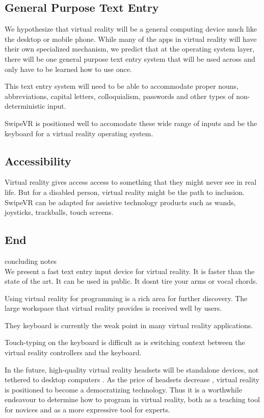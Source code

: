 \subsection{General Purpose Text Entry}
We hypothesize that virtual reality will be a general computing device much like the desktop or mobile phone.
While many of the apps in virtual reality will have their own specialized mechanism, we predict that at the operating system layer, there will be one general purpose text entry system that will be used across and only have to be learned how to use once.

This text entry system will need to be able to accommodate proper nouns, abbreviations, capital letters, colloquialism, passwords and other types of non-deterministic input.

SwipeVR is positioned well to accomodate these wide range of inputs and be the keyboard for a virtual reality operating system.

\subsection{Accessibility}
Virtual reality gives access access to something that they might never see in real life.
But for a disabled person, virtual reality might be the path to inclusion.
SwipeVR can be adapted for assistive technology products such as wands, joysticks, trackballs, touch screens.


\subsection{End}

concluding notes
\\
We present a fast text entry input device for virtual reality.
It is faster than the state of the art.
It can be used in public.
It dosnt tire your arms or vocal chords.

Using virtual reality for programming is a rich area for further discovery.
The large workspace that virtual reality provides is received well by users.

They keyboard is currently the weak point in many virtual reality applications.

Touch-typing on the keyboard is difficult as is switching context between the virtual reality controllers and the keyboard.

In the future, high-quality virtual reality headsets will be standalone devices, not tethered to desktop computers \cite{schaller1997moore}.
As the price of headsets decrease \cite{brown2016virtual}, virtual reality is positioned to become a democratizing technology.
Thus it is a worthwhile endeavour to determine how to program in virtual reality, both as a teaching tool for novices and as a more expressive tool for experts.

